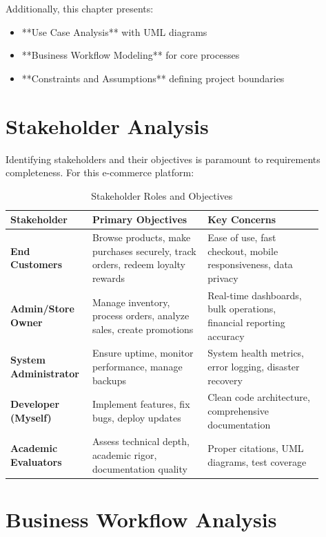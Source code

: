 Additionally, this chapter presents:
\begin{itemize}
    \item **Use Case Analysis** with UML diagrams
    \item **Business Workflow Modeling** for core processes
    \item **Constraints and Assumptions** defining project boundaries
\end{itemize}

\section{Stakeholder Analysis}

Identifying stakeholders and their objectives is paramount to requirements completeness. For this e-commerce platform:

\begin{table}[H]
\centering
\caption{Stakeholder Roles and Objectives}
\label{tab:stakeholders}
\begin{tabular}{@{}p{0.20\linewidth}p{0.35\linewidth}p{0.35\linewidth}@{}}
\toprule
\textbf{Stakeholder} & \textbf{Primary Objectives} & \textbf{Key Concerns} \\
\midrule
\textbf{End Customers} & Browse products, make purchases securely, track orders, redeem loyalty rewards & Ease of use, fast checkout, mobile responsiveness, data privacy \\
\textbf{Admin/Store Owner} & Manage inventory, process orders, analyze sales, create promotions & Real-time dashboards, bulk operations, financial reporting accuracy \\
\textbf{System Administrator} & Ensure uptime, monitor performance, manage backups & System health metrics, error logging, disaster recovery \\
\textbf{Developer (Myself)} & Implement features, fix bugs, deploy updates & Clean code architecture, comprehensive documentation \\
\textbf{Academic Evaluators} & Assess technical depth, academic rigor, documentation quality & Proper citations, UML diagrams, test coverage \\
\bottomrule
\end{tabular}
\end{table}

\section{Business Workflow Analysis}

